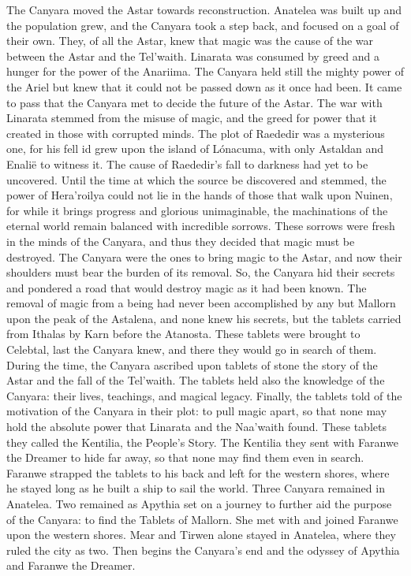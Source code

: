\documentclass[smalldemyvopaper,11pt,twoside,onecolumn,openright,extrafontsizes]{memoir}
\begin{document}
{{	The Canyara moved the Astar towards reconstruction. Anatelea was built up and the population grew, and the Canyara took a step back, and focused on a goal of their own. They, of all the Astar, knew that magic was the cause of the war between the Astar and the Tel'waith. Linarata was consumed by greed and a hunger for the power of the Anariima. The Canyara held still the mighty power of the Ariel but knew that it could not be passed down as it once had been.
	It came to pass that the Canyara met to decide the future of the Astar. The war with Linarata stemmed from the misuse of magic, and the greed for power that it created in those with corrupted minds. The plot of Raededir was a mysterious one, for his fell id grew upon the island of Lónacuma, with only Astaldan and Enalië to witness it. The cause of Raededir’s fall to darkness had yet to be uncovered. Until the time at which the source be discovered and stemmed, the power of Hera’roilya could not lie in the hands of those that walk upon Nuinen, for while it brings progress and glorious unimaginable, the machinations of the eternal world remain balanced with incredible sorrows. These sorrows were fresh in the minds of the Canyara, and thus they decided that magic must be destroyed. The Canyara were the ones to bring magic to the Astar, and now their shoulders must bear the burden of its removal.
So, the Canyara hid their secrets and pondered a road that would destroy magic as it had been known. The removal of magic from a being had never been accomplished by any but Mallorn upon the peak of the Astalena, and none knew his secrets, but the tablets carried from Ithalas by Karn before the Atanosta. These tablets were brought to Celebtal, last the Canyara knew, and there they would go in search of them. During the time, the Canyara ascribed upon tablets of stone the story of the Astar and the fall of the Tel’waith. The tablets held also the knowledge of the Canyara: their lives, teachings, and magical legacy. Finally, the tablets told of the motivation of the Canyara in their plot: to pull magic apart, so that none may hold the absolute power that Linarata and the Naa’waith found. These tablets they called the Kentilia, the People’s Story.
The Kentilia they sent with Faranwe the Dreamer to hide far away, so that none may find them even in search. Faranwe strapped the tablets to his back and left for the western shores, where he stayed long as he built a ship to sail the world.
Three Canyara remained in Anatelea. Two remained as Apythia set on a journey to further aid the purpose of the Canyara: to find the Tablets of Mallorn. She met with and joined Faranwe upon the western shores. Mear and Tirwen alone stayed in Anatelea, where they ruled the city as two. Then begins the Canyara’s end and the odyssey of Apythia and Faranwe the Dreamer. 

}}
\end{document}
